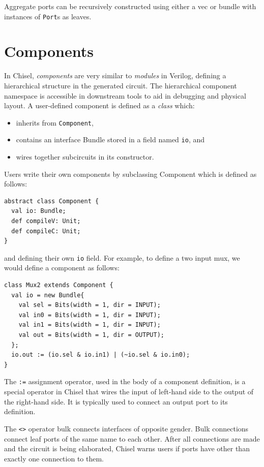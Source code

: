 \documentclass[10pt,twocolumn]{article}
\def\code#1{{\small\tt #1}}
\begin{document}
\noindent
Aggregate ports can be recursively constructed using either a vec or
bundle with instances of \code{Port}s as leaves.  

\section{Components}

In Chisel, {\em components} are very similar to {\em modules} in
Verilog, defining a hierarchical structure in the generated circuit.
The hierarchical component namespace is accessible in downstream tools
to aid in debugging and physical layout.  A user-defined component is
defined as a {\em class} which:
\begin{itemize}
\item inherits from \code{Component},
\item contains an interface Bundle stored in a field named \code{io}, and
\item wires together subcircuits in its constructor.
\end{itemize}

Users write their own components by subclassing Component which is
defined as follows:

\begin{lstlisting}
abstract class Component {
  val io: Bundle;
  def compileV: Unit;
  def compileC: Unit;
}
\end{lstlisting}

\noindent
and defining their own \code{io} field.  For example, to define a two
input mux, we would define a component as follows:

\begin{lstlisting}
class Mux2 extends Component {
  val io = new Bundle{
    val sel = Bits(width = 1, dir = INPUT);
    val in0 = Bits(width = 1, dir = INPUT);
    val in1 = Bits(width = 1, dir = INPUT);
    val out = Bits(width = 1, dir = OUTPUT);
  };
  io.out := (io.sel & io.in1) | (~io.sel & io.in0);
}
\end{lstlisting}

\noindent
The \code{:=} assignment operator, used in the body of a
component definition, is a special operator in Chisel that wires the input of
left-hand side to the output of the right-hand side.  It is typically
used to connect an output port to its definition.

The \code{<>} operator bulk connects interfaces of opposite gender.
Bulk connections connect leaf ports of the same name to each other.
After all connections are made and the circuit is being elaborated,
Chisel warns users if ports have other than exactly one connection to them.
\end{document}
